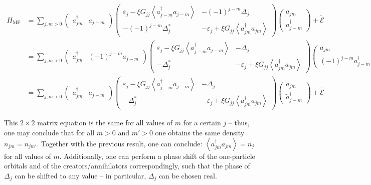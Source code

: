 \documentclass[8pt, a4paper]{article}
\newcommand{\expec}[1]{\left\langle#1\right\rangle}
\begin{document}
\begin{align*}
H_\mathrm{MF} &= \sum_{j,m>0}\begin{pmatrix}a_{jm}^\dagger & a_{j-m}\end{pmatrix}\begin{pmatrix}\varepsilon_j -\xi G_{jj}\expec{a_{j-m}^\dagger a_{j-m}}&-(-1)^{j-m}\Delta_j\\-(-1)^{j-m}\Delta_j^*&-\varepsilon_j + \xi G_{jj}\expec{a_{jm}^\dagger a_{jm}}\end{pmatrix}\begin{pmatrix}a_{jm}\\a_{j-m}^\dagger\end{pmatrix}+\widetilde{\mathcal E}
\\&=
\sum_{j,m>0}\begin{pmatrix}a_{jm}^\dagger & (-1)^{j-m}a_{j-m}\end{pmatrix}\begin{pmatrix}\varepsilon_j - \xi G_{jj}\expec{a_{j-m}^\dagger a_{j-m}}&-\Delta_j\\-\Delta_j^*&-\varepsilon_j + \xi G_{jj}\expec{a_{jm}^\dagger a_{jm}}\end{pmatrix}\begin{pmatrix}a_{jm}\\(-1)^{j-m}a_{j-m}^\dagger\end{pmatrix}+\widetilde{\mathcal E}
\\&=
\sum_{j,m>0}\begin{pmatrix}a_{jm}^\dagger & \widetilde a_{j-m}\end{pmatrix}\begin{pmatrix}\varepsilon_j -\xi  G_{jj}\expec{\widetilde a_{j-m}^\dagger \widetilde a_{j-m}}&-\Delta_j\\-\Delta_j^*&-\varepsilon_j +\xi G_{jj}\expec{a_{jm}^\dagger a_{jm}}\end{pmatrix}\begin{pmatrix}a_{jm}\\\widetilde a_{j-m}^\dagger\end{pmatrix}+\widetilde{\mathcal E}
\end{align*}

This $2\times 2$ matrix equation is the same for all values of $m$ for a certain $j$ -- thus, one may conclude that for all $m>0$ and $m'>0$ one obtains the same density $n_{jm}=n_{jm'}$. Together with the previous result, one can conclude: $\expec{a_{jm}^\dagger a_{jm}} = n_j$ for all values of $m$. Additionally, one can perform a phase shift of the one-particle orbitals and of the creators/annihilators correspondingly, such that the phase of $\Delta_j$ can be shifted to any value -- in particular, $\Delta_j$ can be chosen real.\\
\end{document}
